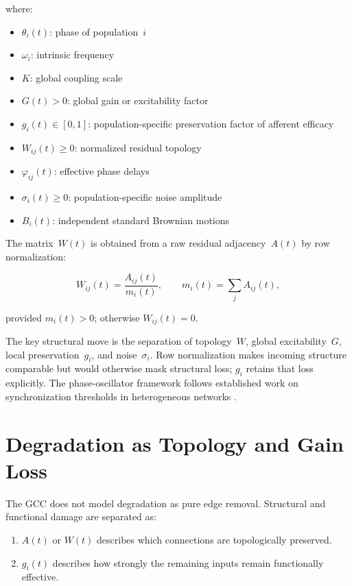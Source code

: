 \documentclass[11pt,a4paper]{article}
\theoremstyle{plain}
\theoremstyle{definition}
\theoremstyle{remark}
\begin{document}
where:
\begin{itemize}
  \item $\theta_i(t)$: phase of population~$i$
  \item $\omega_i$: intrinsic frequency
  \item $K$: global coupling scale
  \item $G(t) > 0$: global gain or excitability factor
  \item $g_i(t) \in [0,1]$: population-specific preservation factor of afferent efficacy
  \item $W_{ij}(t) \geq 0$: normalized residual topology
  \item $\varphi_{ij}(t)$: effective phase delays
  \item $\sigma_i(t) \geq 0$: population-specific noise amplitude
  \item $B_i(t)$: independent standard Brownian motions
\end{itemize}

The matrix~$W(t)$ is obtained from a raw residual adjacency~$A(t)$ by row normalization:

\begin{equation}
\label{eq:normierung}
W_{ij}(t) = \frac{A_{ij}(t)}{m_i(t)}, \qquad m_i(t) = \sum_j A_{ij}(t),
\end{equation}

provided $m_i(t) > 0$; otherwise $W_{ij}(t) = 0$.

The key structural move is the separation of topology~$W$, global excitability~$G$, local preservation~$g_i$, and noise~$\sigma_i$. Row normalization makes incoming structure comparable but would otherwise mask structural loss; $g_i$ retains that loss explicitly. The phase-oscillator framework follows established work on synchronization thresholds in heterogeneous networks \citep{restrepo2005}.


\section{Degradation as Topology and Gain Loss}
\label{sec:abbau}
\label{sec:degradation}

The GCC does not model degradation as pure edge removal. Structural and functional damage are separated as:

\begin{enumerate}
  \item $A(t)$ or $W(t)$ describes which connections are topologically preserved.
  \item $g_i(t)$ describes how strongly the remaining inputs remain functionally effective.
\end{enumerate}
\end{document}
